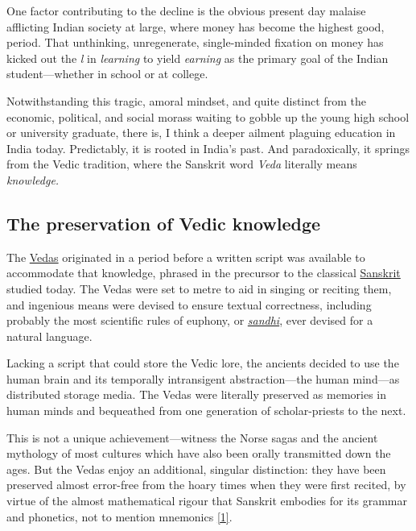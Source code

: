 \documentclass[
  a4paper,
]{article}
\begin{document}
One factor contributing to the decline is the obvious present day
malaise afflicting Indian society at large, where money has become the
highest good, period. That unthinking, unregenerate, single-minded
fixation on money has kicked out the \emph{l} in \emph{learning} to
yield \emph{earning} as the primary goal of the Indian student---whether
in school or at college.

Notwithstanding this tragic, amoral mindset, and quite distinct from the
economic, political, and social morass waiting to gobble up the young
high school or university graduate, there is, I think a deeper ailment
plaguing education in India today. Predictably, it is rooted in India's
past. And paradoxically, it springs from the Vedic tradition, where the
Sanskrit word \emph{Veda} literally means \emph{knowledge.}

\hypertarget{the-preservation-of-vedic-knowledge}{%
\subsection{The preservation of Vedic
knowledge}\label{the-preservation-of-vedic-knowledge}}

The \href{http://en.wikipedia.org/wiki/Vedas}{Vedas} originated in a
period before a written script was available to accommodate that
knowledge, phrased in the precursor to the classical
\href{http://en.wikipedia.org/wiki/Sanskrit}{Sanskrit} studied today.
The Vedas were set to metre to aid in singing or reciting them, and
ingenious means were devised to ensure textual correctness, including
probably the most scientific rules of euphony, or
\href{https://en.wikipedia.org/wiki/Sandhi}{\emph{sandhi}}, ever devised
for a natural language.

Lacking a script that could store the Vedic lore, the ancients decided
to use the human brain and its temporally intransigent abstraction---the
human mind---as distributed storage media. The Vedas were literally
preserved as memories in human minds and bequeathed from one generation
of scholar-priests to the next.

This is not a unique achievement---witness the Norse sagas and the
ancient mythology of most cultures which have also been orally
transmitted down the ages. But the Vedas enjoy an additional, singular
distinction: they have been preserved almost error-free from the hoary
times when they were first recited, by virtue of the almost mathematical
rigour that Sanskrit embodies for its grammar and phonetics, not to
mention mnemonics \protect\hyperlink{ref-bhatekak1993}{{[}1{]}}.
\end{document}
